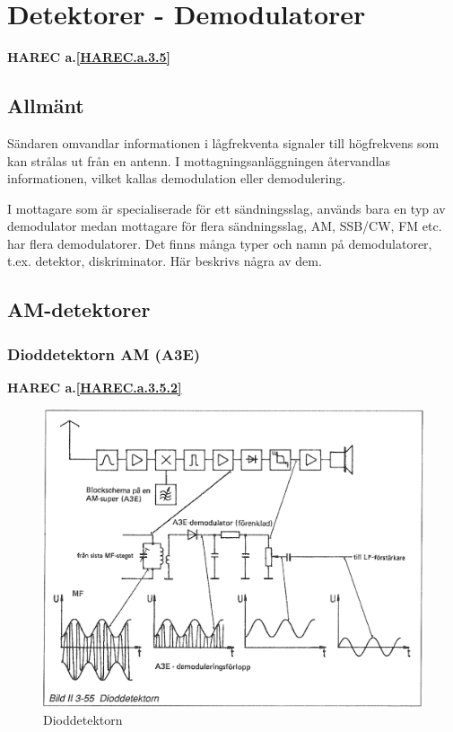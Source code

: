 \section{Detektorer - Demodulatorer}
\textbf{HAREC a.\ref{HAREC.a.3.5}\label{myHAREC.a.3.5}}

\subsection{Allmänt}

Sändaren omvandlar informationen i lågfrekventa signaler till
högfrekvens som kan strålas ut från en antenn. I
mottagningsanläggningen återvandlas informationen, vilket kallas
demodulation eller demodulering.

I mottagare som är specialiserade för ett sändningsslag, används bara
en typ av demodulator medan mottagare för flera sändningsslag, AM,
SSB/CW, FM etc. har flera demodulatorer. Det finns många typer och
namn på demodulatorer, t.ex. detektor, diskriminator. Här beskrivs
några av dem.

\subsection{AM-detektorer}

\subsubsection{Dioddetektorn AM (A3E)}
\textbf{HAREC a.\ref{HAREC.a.3.5.2}\label{myHAREC.a.3.5.2}}

\begin{figure}
\includegraphics[width=\textwidth]{images/bild_2_3-55}
\caption{Dioddetektorn}
\label{fig:BildII3-55}
\end{figure}

